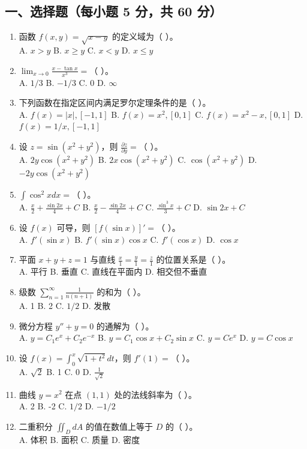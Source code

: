 \documentclass[11pt,a4paper]{article}
\begin{document}
\subsection*{一、选择题（每小题 5 分，共 60 分）}
\begin{enumerate}
    \item 函数 $f(x, y) = \sqrt{x-y}$ 的定义域为（ ）。 \\
    A. $x > y$ \quad B. $x \ge y$ \quad C. $x < y$ \quad D. $x \le y$
    \item $\lim_{x \to 0} \frac{x - \tan x}{x^3} = $（ ）。 \\
    A. $1/3$ \quad B. $-1/3$ \quad C. 0 \quad D. $\infty$
    \item 下列函数在指定区间内满足罗尔定理条件的是（ ）。 \\
    A. $f(x) = |x|, [-1, 1]$ \quad B. $f(x) = x^2, [0, 1]$ \quad C. $f(x) = x^2-x, [0, 1]$ \quad D. $f(x) = 1/x, [-1, 1]$
    \item 设 $z = \sin(x^2+y^2)$，则 $\frac{\partial z}{\partial y} = $（ ）。 \\
    A. $2y \cos(x^2+y^2)$ \quad B. $2x \cos(x^2+y^2)$ \quad C. $\cos(x^2+y^2)$ \quad D. $-2y \cos(x^2+y^2)$
    \item $\int \cos^2 x dx = $（ ）。 \\
    A. $\frac{x}{2} + \frac{\sin 2x}{4} + C$ \quad B. $\frac{x}{2} - \frac{\sin 2x}{4} + C$ \quad C. $\frac{\sin^3 x}{3} + C$ \quad D. $\sin 2x + C$
    \item 设 $f(x)$ 可导，则 $[f(\sin x)]' = $（ ）。 \\
    A. $f'(\sin x)$ \quad B. $f'(\sin x) \cos x$ \quad C. $f'(\cos x)$ \quad D. $\cos x$
    \item 平面 $x+y+z=1$ 与直线 $\frac{x}{1} = \frac{y}{1} = \frac{z}{1}$ 的位置关系是（ ）。 \\
    A. 平行 \quad B. 垂直 \quad C. 直线在平面内 \quad D. 相交但不垂直
    \item 级数 $\sum_{n=1}^{\infty} \frac{1}{n(n+1)}$ 的和为（ ）。 \\
    A. 1 \quad B. 2 \quad C. $1/2$ \quad D. 发散
    \item 微分方程 $y'' + y = 0$ 的通解为（ ）。 \\
    A. $y = C_1 e^x + C_2 e^{-x}$ \quad B. $y = C_1 \cos x + C_2 \sin x$ \quad C. $y = C e^x$ \quad D. $y = C \cos x$
    \item 设 $f(x) = \int_0^x \sqrt{1+t^2} dt$，则 $f'(1) = $（ ）。 \\
    A. $\sqrt{2}$ \quad B. 1 \quad C. 0 \quad D. $\frac{1}{\sqrt{2}}$
    \item 曲线 $y = x^2$ 在点 $(1, 1)$ 处的法线斜率为（ ）。 \\
    A. 2 \quad B. -2 \quad C. $1/2$ \quad D. $-1/2$
    \item 二重积分 $\iint_D dA$ 的值在数值上等于 $D$ 的（ ）。 \\
    A. 体积 \quad B. 面积 \quad C. 质量 \quad D. 密度
\end{enumerate}
\end{document}
